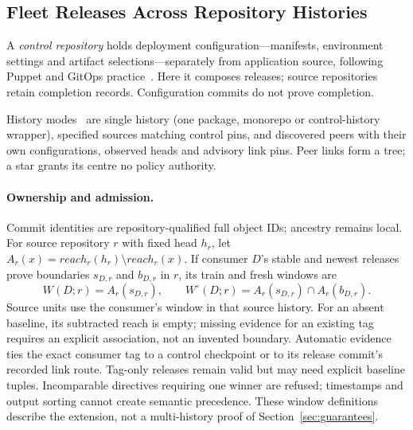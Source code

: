 \subsection{Fleet Releases Across Repository Histories}
\label{sec:fleet}
A \emph{control repository} holds deployment configuration---manifests,
environment settings and artifact selections---separately from application
source, following Puppet and GitOps practice~\cite{puppetcontrol,gitopsenv}.
Here it composes releases; source repositories retain completion records.
Configuration commits do not prove completion.

History modes~\cite{ccme2} are single history (one package, monorepo or
control-history wrapper), specified sources matching control pins, and
discovered peers with their own configurations, observed heads and advisory
link pins. Peer links form a tree; a star grants its centre no policy authority.

\paragraph{Ownership and admission.}
Commit identities are repository-qualified full object IDs; ancestry remains
local. For source repository $r$ with fixed head $h_r$, let
$A_r(x)=\mathit{reach}_r(h_r)\setminus\mathit{reach}_r(x)$.
If consumer $D$'s stable and newest releases prove boundaries $s_{D,r}$ and
$b_{D,r}$ in $r$, its train and fresh windows are
\[
 W(D;r)=A_r(s_{D,r}),\qquad
 W^\circ(D;r)=A_r(s_{D,r})\cap A_r(b_{D,r}).
\]
Source units use the consumer's window in that source history. For an absent
baseline, its subtracted reach is empty; missing evidence for an existing tag requires
an explicit association, not an invented boundary. Automatic evidence ties the
exact consumer tag to a control checkpoint or to its release commit's recorded
link route. Tag-only releases remain valid but may need explicit baseline tuples.
Incomparable directives requiring one winner are refused; timestamps and output
sorting cannot create semantic precedence. These window definitions describe
the extension, not a multi-history proof of Section~\ref{sec:guarantees}.

